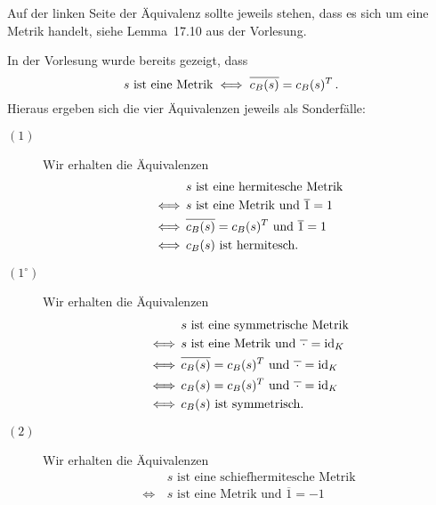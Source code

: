 \section{}

\begin{remark}
  Auf der linken Seite der Äquivalenz sollte jeweils stehen, dass es sich um eine Metrik handelt, siehe Lemma~17.10 aus der Vorlesung.
\end{remark}


In der Vorlesung wurde bereits gezeigt, dass
\[
  \text{$s$ ist eine Metrik}
  \iff
  \overline{\repmatrixbilone{s}{B}} = \repmatrixbilone{s}{B}^T \,.
\]
Hieraus ergeben sich die vier Äquivalenzen jeweils als Sonderfälle:

\begin{description}
  \item[$(1)$]
    Wir erhalten die Äquivalenzen
    \begin{align*}
          &\,
      \text{$s$ ist eine hermitesche Metrik}  \\
      \iff&\,
      \text{$s$ ist eine Metrik und $\overline{1} = 1$} \\
      \iff&\,
      \text{$\overline{\repmatrixbilone{s}{B}} = \repmatrixbilone{s}{B}^T$ und $\overline{1} = 1$}  \\
      \iff&\,
      \text{$\repmatrixbilone{s}{B}$ ist hermitesch}.
    \end{align*}
  \item[$(1^\circ)$]
    Wir erhalten die Äquivalenzen
    \begin{align*}
          &\,
      \text{$s$ ist eine symmetrische Metrik}  \\
      \iff&\,
      \text{$s$ ist eine Metrik und $\overline{\,\cdot\,} = \id_K$} \\
      \iff&\,
      \text{$\overline{\repmatrixbilone{s}{B}} = \repmatrixbilone{s}{B}^T$ und $\overline{\,\cdot\,} = \id_K$}  \\
      \iff&\,
      \text{$\repmatrixbilone{s}{B} = \repmatrixbilone{s}{B}^T$ und $\overline{\,\cdot\,} = \id_K$}  \\
      \iff&\,
      \text{$\repmatrixbilone{s}{B}$ ist symmetrisch}.
    \end{align*}
  \item[$(2)$]
    Wir erhalten die Äquivalenzen
    \begin{align*}
          &\,
      \text{$s$ ist eine schiefhermitesche Metrik}  \\
      \iff&\,
      \text{$s$ ist eine Metrik und $\overline{1} = -1$} \\

\end{align*}
\end{description}
